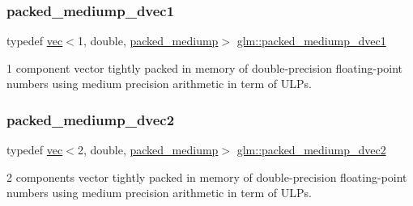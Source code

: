 \subsubsection{\texorpdfstring{packed\+\_\+mediump\+\_\+dvec1}{packed\_mediump\_dvec1}}
{\footnotesize\ttfamily typedef \hyperlink{structglm_1_1vec}{vec}$<$1, double, \hyperlink{namespaceglm_a36ed105b07c7746804d7fdc7cc90ff25a9604654c3b137cd7898689fd34b25bc0}{packed\+\_\+mediump}$>$ \hyperlink{group__gtc__type__aligned_gaf34b2d86391c45507ccc7c605992b8d3}{glm\+::packed\+\_\+mediump\+\_\+dvec1}}



1 component vector tightly packed in memory of double-\/precision floating-\/point numbers using medium precision arithmetic in term of U\+L\+Ps. 

\mbox{\label{group__gtc__type__aligned_ga5cbf23f43f82491a631c35ca8664ae0b}} 
\subsubsection{\texorpdfstring{packed\+\_\+mediump\+\_\+dvec2}{packed\_mediump\_dvec2}}
{\footnotesize\ttfamily typedef \hyperlink{structglm_1_1vec}{vec}$<$2, double, \hyperlink{namespaceglm_a36ed105b07c7746804d7fdc7cc90ff25a9604654c3b137cd7898689fd34b25bc0}{packed\+\_\+mediump}$>$ \hyperlink{group__gtc__type__aligned_ga5cbf23f43f82491a631c35ca8664ae0b}{glm\+::packed\+\_\+mediump\+\_\+dvec2}}



2 components vector tightly packed in memory of double-\/precision floating-\/point numbers using medium precision arithmetic in term of U\+L\+Ps. 

\mbox{\label{group__gtc__type__aligned_ga0c34c771e940f66eccff81d402f83cdd}} 
